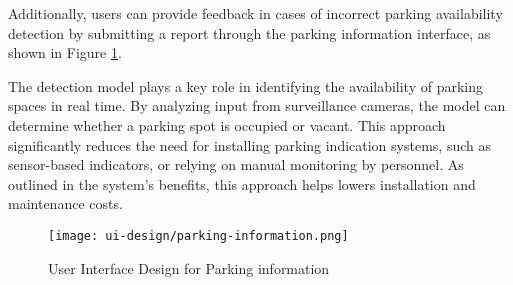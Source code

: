 Additionally, users can provide feedback in cases of incorrect parking availability detection by submitting a report through the parking information interface, as shown in Figure \ref{fig:ui_parking_information}.

The detection model plays a key role in identifying the availability of parking spaces in real time. By analyzing input from surveillance cameras, the model can determine whether a parking spot is occupied or vacant. This approach significantly reduces the need for installing parking indication systems, such as sensor-based indicators, or relying on manual monitoring by personnel. As outlined in the system's benefits, this approach helps lowers installation and maintenance costs.

\begin{figure}[h]
    \centering
    \texttt{[image: ui-design/parking-information.png]}
    \caption{User Interface Design for Parking information}
    \label{fig:ui_parking_information}
\end{figure}
